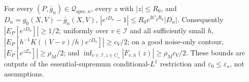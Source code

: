 For every \((P,\bar g_n)\in\mathcal Q_{\mathrm{spec},n}\), every \(z\) with \(|z|\le R_0\), and \(D_n=g_0(X,V)-\bar g_n(X,V)\), \(|e^{zD_n}-1|\le R_0e^{2C_gR_0}|D_n|\). Consequently \(|E_P[e^{zD_n}]|\ge1/2\); uniformly over \(v\in\mathcal I\) and all sufficiently small \(h\), \(|E_P[h^{-1}K((V-v)/h)e^{zD_n}]|\ge c_V/2\); on a good noise-only contour, \(|E_P[e^{zZ_n}]|\ge\rho_M/2\); and \(\inf_{v\in\mathcal I,z\in C_\star}|F_{v,h}(z)|\ge\rho_Mc_V/2\). These bounds are outputs of the essential-supremum conditional-\(L^1\) restriction and \(\varepsilon_0\le\varepsilon_\star\), not assumptions.